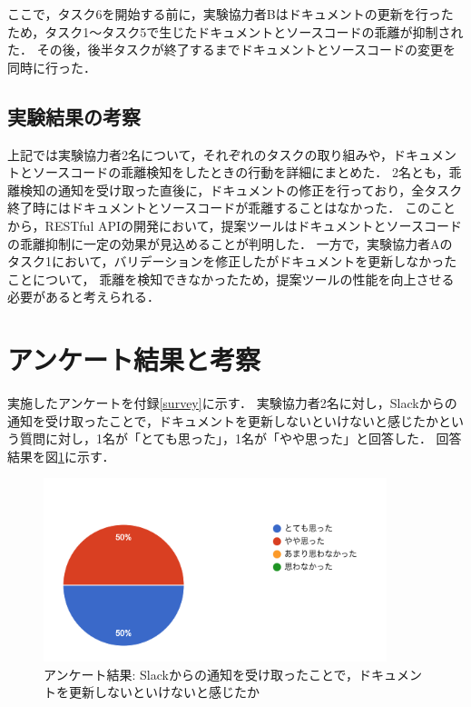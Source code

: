 ここで，タスク6を開始する前に，実験協力者Bはドキュメントの更新を行ったため，タスク1〜タスク5で生じたドキュメントとソースコードの乖離が抑制された．
その後，後半タスクが終了するまでドキュメントとソースコードの変更を同時に行った．

\subsection{実験結果の考察}
上記では実験協力者2名について，それぞれのタスクの取り組みや，ドキュメントとソースコードの乖離検知をしたときの行動を詳細にまとめた．
2名とも，乖離検知の通知を受け取った直後に，ドキュメントの修正を行っており，全タスク終了時にはドキュメントとソースコードが乖離することはなかった．
このことから，RESTful APIの開発において，提案ツールはドキュメントとソースコードの乖離抑制に一定の効果が見込めることが判明した．
一方で，実験協力者Aのタスク1において，バリデーションを修正したがドキュメントを更新しなかったことについて，
乖離を検知できなかったため，提案ツールの性能を向上させる必要があると考えられる．

\section{アンケート結果と考察}
実施したアンケートを付録\ref{survey}に示す．
実験協力者2名に対し，Slackからの通知を受け取ったことで，ドキュメントを更新しないといけないと感じたかという質問に対し，1名が「とても思った」，1名が「やや思った」と回答した．
回答結果を図\ref{q1}に示す．
\begin{figure}[H]
    \centering
    \includegraphics[width=10cm]{images/q1.png}
    \caption{アンケート結果: Slackからの通知を受け取ったことで，ドキュメントを更新しないといけないと感じたか}
    \label{q1}
\end{figure}

